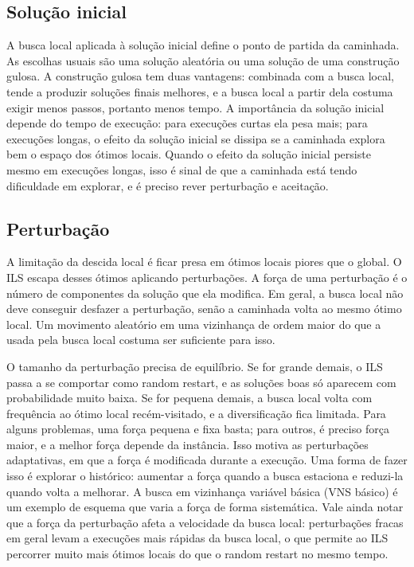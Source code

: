 \documentclass[11pt,a4paper]{article}
\begin{document}
\subsection{Solução inicial}

A busca local aplicada à solução inicial define o ponto de partida da caminhada. As escolhas usuais são uma solução aleatória ou uma solução de uma construção gulosa. A construção gulosa tem duas vantagens: combinada com a busca local, tende a produzir soluções finais melhores, e a busca local a partir dela costuma exigir menos passos, portanto menos tempo. A importância da solução inicial depende do tempo de execução: para execuções curtas ela pesa mais; para execuções longas, o efeito da solução inicial se dissipa se a caminhada explora bem o espaço dos ótimos locais. Quando o efeito da solução inicial persiste mesmo em execuções longas, isso é sinal de que a caminhada está tendo dificuldade em explorar, e é preciso rever perturbação e aceitação.

\subsection{Perturbação}

A limitação da descida local é ficar presa em ótimos locais piores que o global. O ILS escapa desses ótimos aplicando perturbações. A força de uma perturbação é o número de componentes da solução que ela modifica. Em geral, a busca local não deve conseguir desfazer a perturbação, senão a caminhada volta ao mesmo ótimo local. Um movimento aleatório em uma vizinhança de ordem maior do que a usada pela busca local costuma ser suficiente para isso.

O tamanho da perturbação precisa de equilíbrio. Se for grande demais, o ILS passa a se comportar como random restart, e as soluções boas só aparecem com probabilidade muito baixa. Se for pequena demais, a busca local volta com frequência ao ótimo local recém-visitado, e a diversificação fica limitada. Para alguns problemas, uma força pequena e fixa basta; para outros, é preciso força maior, e a melhor força depende da instância. Isso motiva as perturbações adaptativas, em que a força é modificada durante a execução. Uma forma de fazer isso é explorar o histórico: aumentar a força quando a busca estaciona e reduzi-la quando volta a melhorar. A busca em vizinhança variável básica (VNS básico) é um exemplo de esquema que varia a força de forma sistemática. Vale ainda notar que a força da perturbação afeta a velocidade da busca local: perturbações fracas em geral levam a execuções mais rápidas da busca local, o que permite ao ILS percorrer muito mais ótimos locais do que o random restart no mesmo tempo.
\end{document}

